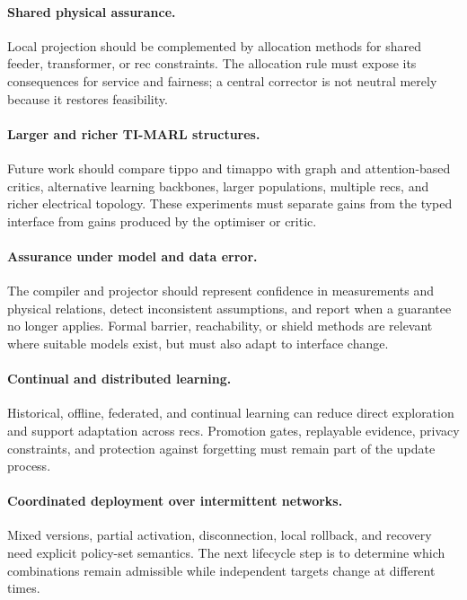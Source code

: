 \paragraph{Shared physical assurance.}
Local projection should be complemented by allocation methods for shared feeder, transformer, or \gls{rec} constraints. The allocation rule must expose its consequences for service and fairness; a central corrector is not neutral merely because it restores feasibility.

\paragraph{Larger and richer TI-MARL structures.}
Future work should compare \gls{tippo} and \gls{timappo} with graph and attention-based critics, alternative learning backbones, larger populations, multiple \glspl{rec}, and richer electrical topology. These experiments must separate gains from the typed interface from gains produced by the optimiser or critic.

\paragraph{Assurance under model and data error.}
The compiler and projector should represent confidence in measurements and physical relations, detect inconsistent assumptions, and report when a guarantee no longer applies. Formal barrier, reachability, or shield methods are relevant where suitable models exist, but must also adapt to interface change.

\paragraph{Continual and distributed learning.}
Historical, offline, federated, and continual learning can reduce direct exploration and support adaptation across \glspl{rec}. Promotion gates, replayable evidence, privacy constraints, and protection against forgetting must remain part of the update process.

\paragraph{Coordinated deployment over intermittent networks.}
Mixed versions, partial activation, disconnection, local rollback, and recovery need explicit policy-set semantics. The next lifecycle step is to determine which combinations remain admissible while independent targets change at different times.


